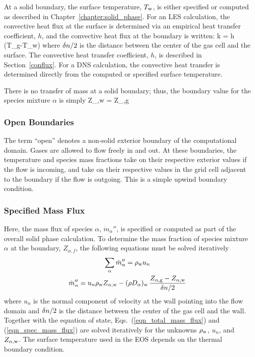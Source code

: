 At a solid boundary, the surface temperature, $T_{\rm w}$, is either specified or computed as described in Chapter~\ref{chapter:solid_phase}. For an LES calculation, the convective heat flux at the surface is determined via an empirical heat transfer coefficient, $h$, and the convective heat flux at the boundary is written:
\be
   k  = h \; (T_{\rm g}-T_{\rm w})  \label{ebal}
\ee
where $\delta n/2$ is the distance between the center of the gas cell and the surface. The convective heat transfer coefficient, $h$, is described in Section~\ref{conflux}. For a DNS calculation, the convective heat transfer is determined directly from the computed or specified surface temperature.

There is no transfer of mass at a solid boundary; thus, the boundary value for the species mixture $\alpha$ is simply
\be Z_{\rm \alpha,w} = Z_{\rm \alpha,g} \ee

\subsubsection{Open Boundaries}

The term ``open'' denotes a non-solid exterior boundary of the computational domain. Gases are allowed to flow freely in and out. At these boundaries, the temperature and species mass fractions take on their respective exterior values if the flow is incoming, and take on their respective values in the grid cell adjacent to the boundary if the flow is outgoing. This is a simple upwind boundary condition.



\subsubsection{Specified Mass Flux}

Here, the mass flux of species $\alpha$, $\dot{m}_\alpha''$, is specified or computed as part of the overall solid phase calculation. To determine the mass fraction of species mixture $\alpha$ at the boundary, $Z_{\alpha,f}$, the following equations must be solved iteratively
\begin{gather}
\label{eqn_total_mass_flux} \sum_\alpha \dot{m}_\alpha'' = \rho_{\rm w} u_n \\
\label{eqn_spec_mass_flux}  \dot{m}_\alpha'' = u_n \rho_{\rm w} Z_{\rm \alpha,w} - (\rho D_\alpha)_{\rm w} \, \frac{Z_{\rm \alpha,g}-Z_{\rm \alpha,w}}{\delta n/2}
\end{gather}
where $u_n$ is the normal component of velocity at the wall pointing into the flow domain and $\delta n/2$ is the distance between the center of the gas cell and the wall. Together with the equation of state, Eqs.~(\ref{eqn_total_mass_flux}) and (\ref{eqn_spec_mass_flux}) are solved iteratively for the unknowns $\rho_{\rm w}$, $u_n$, and $Z_{\rm \alpha,w}$.  The surface temperature used in the EOS depends on the thermal boundary condition.


